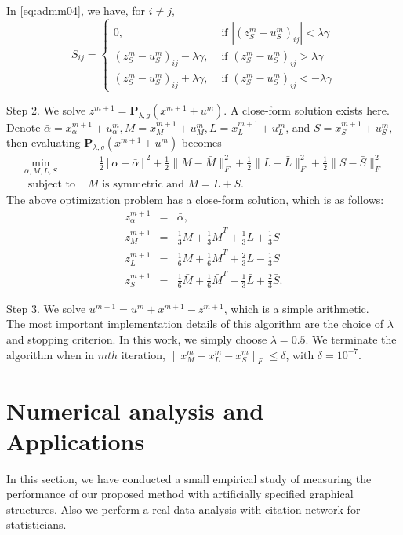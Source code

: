 \documentclass[AMS,STIX1COL]{WileyNJD-v2}
\begin{document}
In \eqref{eq:admm04}, we have, for $i \neq j$,
\[
S_{ij} = \left\{
\begin{array}{ll}
0, & \mbox{ if } |(z^m_S - u^m_S)_{ij}| < \lambda \gamma  \\
(z^m_S - u^m_S)_{ij}-\lambda\gamma , &
\mbox{ if } (z^m_S - u^m_S)_{ij} > \lambda \gamma \\
(z^m_S - u^m_S)_{ij}+\lambda\gamma , &
\mbox{ if } (z^m_S - u^m_S)_{ij} <- \lambda \gamma
\end{array}
\right.
\]


\noindent
Step 2. We solve $z^{m+1} = \mathbf{P}_{\lambda,g}(x^{m+1} + u^m)$.
A close-form solution exists here.
Denote
$
\bar{\alpha} = x^{m+1}_\alpha + u^m_\alpha,
\bar{M} = x^{m+1}_M + u^m_M,
\bar{L} = x^{m+1}_L + u^m_L$, and
$\bar{S} = x^{m+1}_S + u^m_S,
$
then evaluating $\mathbf{P}_{\lambda,g}(x^{m+1} + u^m)$ becomes
\begin{eqnarray*}
\min_{\alpha,M,L,S} & \quad
\frac{1}{2}[\alpha - \bar{\alpha}]^2
+ \frac{1}{2}\|M - \bar{M}\|^2_F
+ \frac{1}{2}\|L - \bar{L}\|^2_F
+ \frac{1}{2}\|S - \bar{S}\|^2_F  \\
\mbox{ subject to } & M \mbox{ is symmetric and } M=L+S.
\end{eqnarray*}
The above optimization problem has a close-form solution, which is as follows:
\begin{eqnarray*}
z^{m+1}_\alpha &=& \bar{\alpha}, \\
z^{m+1}_M &=&
\frac{1}{3} \bar{M} + \frac{1}{3} \bar{M}^T + \frac{1}{3} \bar{L} + \frac{1}{3} \bar{S} \\
z^{m+1}_L &=&
\frac{1}{6} \bar{M} + \frac{1}{6} \bar{M}^T + \frac{2}{3} \bar{L} - \frac{1}{3} \bar{S} \\
z^{m+1}_S &=&
\frac{1}{6} \bar{M} + \frac{1}{6} \bar{M}^T - \frac{1}{3} \bar{L} + \frac{2}{3} \bar{S}.
\end{eqnarray*}

\noindent
Step 3. We solve $u^{m+1} = u^m + x^{m+1} - z^{m+1}$, which is a simple arithmetic. \\

The most important implementation details of this algorithm are the choice of $\lambda$ and stopping criterion.
In this work, we simply choose $\lambda = 0.5$.
We terminate the algorithm  when in $mth$ iteration, $\|x^{m}_M - x^{m}_L - x^{m}_S\|_F \leq \delta$, with $\delta=10^{-7}$.

\section{ Numerical analysis and Applications}
In this section, we have conducted a small empirical study of measuring the performance of our proposed method with artificially specified graphical structures.
Also we perform a real data analysis with citation network for statisticians.
\end{document}
